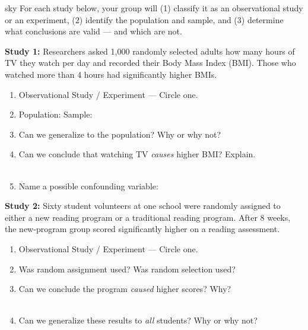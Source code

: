 \documentclass[10pt]{article}
\begin{document}
\namepartnerperiod

\vspace{0.1in}

\begin{scenariobox}[Context]{sky}
\small
For each study below, your group will (1) classify it as an observational study or
an experiment, (2) identify the population and sample, and (3) determine what
conclusions are valid --- and which are not.
\end{scenariobox}

\vspace{0.1in}

\textbf{Study 1:} Researchers asked 1{,}000 randomly selected adults how many hours of
TV they watch per day and recorded their Body Mass Index (BMI). Those who watched
more than 4 hours had significantly higher BMIs.

\begin{practicebox}
\small
\begin{enumerate}[leftmargin=1.5em, itemsep=8pt]
  \item Observational Study \quad / \quad Experiment --- Circle one.
  \item Population: \blank{8cm} \quad Sample: \blank{8cm}
  \item Can we generalize to the population? Why or why not?
        \blank{1cm} \quad \blank{8cm}
  \item Can we conclude that watching TV \emph{causes} higher BMI? Explain.\\
        \writeline\\[1pt]\writeline
  \item Name a possible confounding variable: \blank{8cm}
\end{enumerate}
\end{practicebox}

\vspace{0.1in}

\textbf{Study 2:} Sixty student volunteers at one school were randomly assigned to
either a new reading program or a traditional reading program. After 8 weeks, the
new-program group scored significantly higher on a reading assessment.

\begin{practicebox}
\small
\begin{enumerate}[leftmargin=1.5em, itemsep=8pt]
  \item Observational Study \quad / \quad Experiment --- Circle one.
  \item Was random assignment used? \blank{2cm} \quad Was random selection used? \blank{2cm}
  \item Can we conclude the program \emph{caused} higher scores? Why?\\
        \writeline\\[1pt]\writeline
  \item Can we generalize these results to \emph{all} students? Why or why not?\\
        \writeline\\[1pt]\writeline
\end{enumerate}
\end{practicebox}
\end{document}
